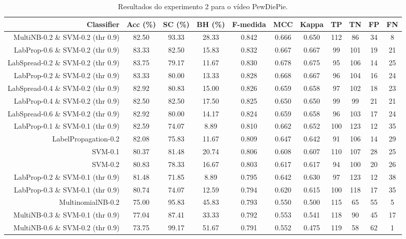 \begin{table}[!htb]
\centering
\caption{Resultados do experimento 2 para o vídeo PewDiePie.}
\label{tab:PewDiePie}
\begin{tabular}{r|c|c|c|c|c|c|c|c|c|c}
\hline\hline
Classifier & Acc (\%) & SC (\%) & BH (\%) & F-medida & MCC & Kappa & TP & TN & FP & FN \\ \hline
MultiNB-0.2 \& SVM-0.2 (thr 0.9) & 82.50 & 93.33 & 28.33 & 0.842 & 0.666 & 0.650 & 112 & 86 & 34 & 8 \\ 
LabProp-0.6 \& SVM-0.2 (thr 0.9) & 83.33 & 82.50 & 15.83 & 0.832 & 0.667 & 0.667 & 99 & 101 & 19 & 21 \\ 
LabSpread-0.2 \& SVM-0.2 (thr 0.9) & 83.75 & 79.17 & 11.67 & 0.830 & 0.678 & 0.675 & 95 & 106 & 14 & 25 \\ 
LabProp-0.2 \& SVM-0.2 (thr 0.9) & 83.33 & 80.00 & 13.33 & 0.828 & 0.668 & 0.667 & 96 & 104 & 16 & 24 \\ 
LabSpread-0.4 \& SVM-0.2 (thr 0.9) & 82.92 & 80.83 & 15.00 & 0.826 & 0.659 & 0.658 & 97 & 102 & 18 & 23 \\ 
LabProp-0.4 \& SVM-0.2 (thr 0.9) & 82.50 & 82.50 & 17.50 & 0.825 & 0.650 & 0.650 & 99 & 99 & 21 & 21 \\ 
LabSpread-0.6 \& SVM-0.2 (thr 0.9) & 82.92 & 80.00 & 14.17 & 0.824 & 0.659 & 0.658 & 96 & 103 & 17 & 24 \\ 
LabProp-0.1 \& SVM-0.1 (thr 0.9) & 82.59 & 74.07 & 8.89 & 0.810 & 0.662 & 0.652 & 100 & 123 & 12 & 35 \\ 
LabelPropagation-0.2 & 82.08 & 75.83 & 11.67 & 0.809 & 0.647 & 0.642 & 91 & 106 & 14 & 29 \\ 
SVM-0.1 & 80.37 & 81.48 & 20.74 & 0.806 & 0.608 & 0.607 & 110 & 107 & 28 & 25 \\ 
SVM-0.2 & 80.83 & 78.33 & 16.67 & 0.803 & 0.617 & 0.617 & 94 & 100 & 20 & 26 \\ 
LabProp-0.2 \& SVM-0.1 (thr 0.9) & 81.48 & 71.85 & 8.89 & 0.795 & 0.642 & 0.630 & 97 & 123 & 12 & 38 \\ 
LabProp-0.3 \& SVM-0.1 (thr 0.9) & 80.74 & 74.07 & 12.59 & 0.794 & 0.620 & 0.615 & 100 & 118 & 17 & 35 \\ 
MultinomialNB-0.2 & 75.00 & 95.83 & 45.83 & 0.793 & 0.550 & 0.500 & 115 & 65 & 55 & 5 \\ 
MultiNB-0.3 \& SVM-0.1 (thr 0.9) & 77.04 & 87.41 & 33.33 & 0.792 & 0.553 & 0.541 & 118 & 90 & 45 & 17 \\ 
MultiNB-0.6 \& SVM-0.2 (thr 0.9) & 73.75 & 99.17 & 51.67 & 0.791 & 0.552 & 0.475 & 119 & 58 & 62 & 1 \\ 

\end{tabular}
\end{table}
